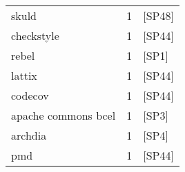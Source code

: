 \begin{tabular}{lrl}
               skuld &      1 &                                           [SP48] \\
          checkstyle &      1 &                                           [SP44] \\
               rebel &      1 &                                            [SP1] \\
              lattix &      1 &                                           [SP44] \\
             codecov &      1 &                                           [SP44] \\
 apache commons bcel &      1 &                                            [SP3] \\
             archdia &      1 &                                            [SP4] \\
                 pmd &      1 &                                           [SP44] \\
\bottomrule
\end{tabular}
